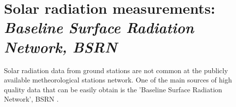


  \section{Solar radiation measurements: \textit{Baseline Surface Radiation Network, BSRN}}

  Solar radiation data from ground stations are not common at the publicly available metheorological stations network. One of the main sources of high quality data that can be easily obtain is the 'Baseline Surface Radiation Network', BSRN \cite*{Konig-Langlo2013}.\\ %

